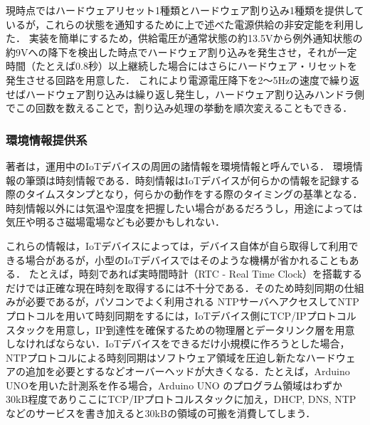 現時点ではハードウェアリセット1種類とハードウェア割り込み1種類を提供しているが，これらの状態を通知するために上で述べた電源供給の非安定能を利用した．
実装を簡単にするため，供給電圧が通常状態の約13.5Vから例外通知状態の約9Vへの降下を検出した時点でハードウェア割り込みを発生させ，それが一定時間（たとえば0.8秒）以上継続した場合にはさらにハードウェア・リセットを発生させる回路を用意した．
これにより電源電圧降下を2〜5Hzの速度で繰り返せばハードウェア割り込みは繰り返し発生し，ハードウェア割り込みハンドラ側でこの回数を数えることで，割り込み処理の挙動を順次変えることもできる．




\subsubsection{環境情報提供系}


著者は，運用中のIoTデバイスの周囲の諸情報を環境情報と呼んでいる．
環境情報の筆頭は時刻情報である．時刻情報はIoTデバイスが何らかの情報を記録する際のタイムスタンプとなり，何らかの動作をする際のタイミングの基準となる．
時刻情報以外には気温や湿度を把握したい場合があるだろうし，用途によっては気圧や明るさ磁場電場なども必要かもしれない．

これらの情報は，IoTデバイスによっては，デバイス自体が自ら取得して利用できる場合があるが，小型のIoTデバイスではそのような機構が省かれることもある．
たとえば，時刻であれば実時間時計（RTC - Real Time Clock）を搭載するだけでは正確な現在時刻を取得するには不十分である．そのため時刻同期の仕組みが必要であるが，パソコンでよく利用される NTPサーバへアクセスしてNTPプロトコルを用いて時刻同期をするには，IoTデバイス側にTCP/IPプロトコルスタックを用意し，IP到達性を確保するための物理層とデータリンク層を用意しなければならない．IoTデバイスをできるだけ小規模に作ろうとした場合，NTPプロトコルによる時刻同期はソフトウェア領域を圧迫し新たなハードウェアの追加を必要とするなどオーバーヘッドが大きくなる．たとえば，Arduino UNO\cite{data:Arduino}を用いた計測系を作る場合，Arduino UNO のプログラム領域はわずか 30kB程度でありここにTCP/IPプロトコルスタックに加え，DHCP, DNS, NTP などのサービスを書き加えると30kBの領域の可搬を消費してしまう．\\


